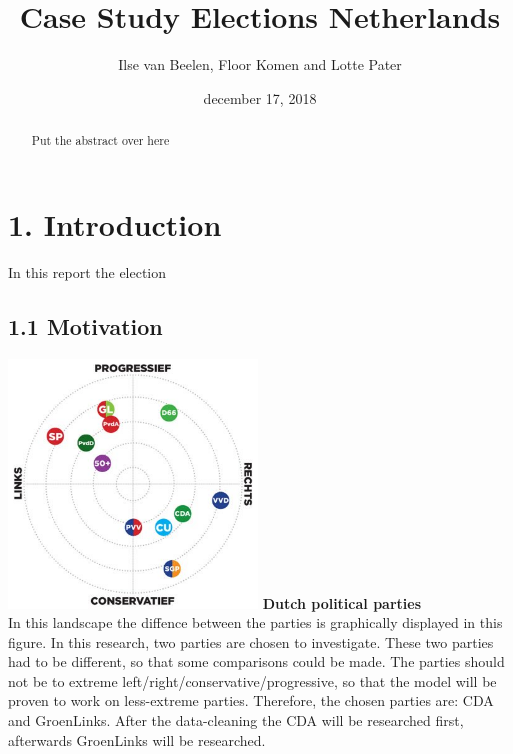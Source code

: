 \documentclass[11pt,]{article}
\title{Case Study Elections Netherlands}
\author{Ilse van Beelen, Floor Komen and Lotte Pater}
\date{december 17, 2018}
\begin{document}
\maketitle
\begin{abstract}
Put the abstract over here
\end{abstract}

\section{1. Introduction}\label{introduction}

In this report the election

\subsection{1.1 Motivation}\label{motivation}

\includegraphics[width=2.60417in]{Partijlandschap.jpg} \textbf{Dutch
political parties}\\
In this landscape the diffence between the parties is graphically
displayed in this figure. In this research, two parties are chosen to
investigate. These two parties had to be different, so that some
comparisons could be made. The parties should not be to extreme
left/right/conservative/progressive, so that the model will be proven to
work on less-extreme parties. Therefore, the chosen parties are: CDA and
GroenLinks. After the data-cleaning the CDA will be researched first,
afterwards GroenLinks will be researched.
\end{document}
